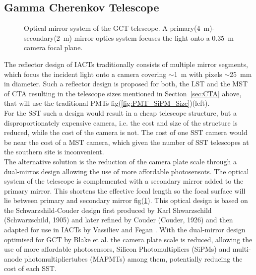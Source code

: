 \documentclass[12pt,article,type=msc,colorback,accentcolor=tud9c]{tudthesis}
\begin{document}
\subsection{Gamma Cherenkov Telescope}
\begin{figure}[t!]
\begin{centering}
\caption[GCT optical system]{Optical mirror system of the GCT telescope. A primary(4~m)-secondary(2~m) mirror optics system focuses the light onto a 0.35~m camera focal plane.}
\label{fig:GCT_Focal}
\end{centering}
\end{figure}
The reflector design of IACTs traditionally consists of multiple mirror segments, which focus the incident light onto a camera covering $\sim$1~m with pixels $\sim$25~mm in diameter. Such a reflector design is proposed for both, the LST and the MST of CTA resulting in the telescope sizes mentioned in Section~{\ref{sec:CTA}} above, that will use the traditional PMTs fig(\ref{fig:PMT_SiPM_Size})(left).\\
For the SST such a design would result in a cheap telescope structure, but a disproportionately expensive camera, i.e. the cost and size of the structure is reduced, while the cost of the camera is not. The cost of one SST camera would be near the cost of a MST camera, which given the number of SST telescopes at the southern site is inconvenient.\\
The alternative solution is the reduction of the camera plate scale through a dual-mirros design allowing the use of more affordable photosensots. The optical system of the telescope is complemented with a secondary mirror added to the primary mirror. This shortens the effective focal length so the focal surface will lie between primary and secondary mirror fig(\ref{fig:GCT_Focal}). This optical design is based on the Schwarzshild-Couder design first produced by Karl Shwarzschild (Schwarzschild, 1905) and later refined by Couder (Couder, 1926) and then adapted for use in IACTs by Vassiliev and Fegan \cite{FeganVassiliev}. With the dual-mirror design optimised for GCT by Blake et al. \cite{SSTGATE} the camera plate scale is reduced, allowing the use of more affordable photosensors, Silicon Photomultipliers (SiPMs) and multi-anode photomultipliertubes (MAPMTs) among them, potentially reducing the cost of each SST.
\end{document}
